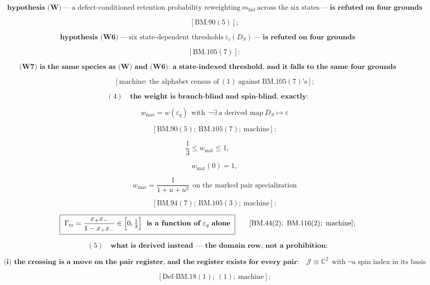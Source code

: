 \documentclass[11pt,openany]{report}
\theoremstyle{canonplain}
\theoremstyle{canondef}
\begin{document}
\[
\qquad \textbf{hypothesis (W)}\ —\ \text{a defect-conditioned retention probability reweighting}\ m_{\mathrm{hid}}\ \text{across the six states}\ —\ \textbf{is refuted on four grounds}
\]

\[
\qquad [\mathrm{BM.90}(5)];
\]

\[
\textbf{hypothesis (W6)}\ —\ \text{six state-dependent thresholds}\ \varepsilon_i(D_S)\ —\ \textbf{is refuted on four grounds}
\]

\[
\qquad [\mathrm{BM.105}(7)]:
\]

\[
\boxed{\ \textbf{(W7) is the same species as (W) and (W6): a state-indexed threshold, and it falls to the same four grounds}\ }
\]

\[
\qquad [\text{machine: the alphabet census of}\ (1)\ \text{against}\ \mathrm{BM.105}(7)\text{'s}];
\]

\[
(4)\quad\textbf{the weight is branch-blind and spin-blind, exactly:}
\]

\[
\qquad w_{\mathrm{mat}}=w(\varepsilon_q)\ \ \text{with}\ \ \neg\exists\ \text{a derived map}\ D_S\mapsto\varepsilon
\]

\[
\qquad [\mathrm{BM.90}(5);\ \mathrm{BM.105}(7);\ \text{machine}]:
\]

\[
\frac13\le w_{\mathrm{mat}}\le1,
\]

\[
\qquad w_{\mathrm{mat}}(0)=1,
\]

\[
\qquad w_{\mathrm{mat}}=\frac1{1+u+u^2}\ \ \text{on the marked pair specialization}
\]

\[
\qquad [\mathrm{BM.94}(7);\ \mathrm{BM.105}(3);\ \text{machine}];
\]

\[
\boxed{\ \Gamma_{\mathrm{tr}}=\frac{x_+x_-}{1-x_+x_-}\in\Bigl[0,\tfrac13\Bigr]\ \ \textbf{is a function of}\ \varepsilon_q\ \textbf{alone}\ }\qquad[\mathrm{BM.44}(2);\ \mathrm{BM.116}(2);\ \text{machine}];
\]

\[
(5)\quad\textbf{what is derived instead — the domain row, not a prohibition:}
\]

\[
\qquad \textbf{(i) the crossing is a move on the pair register, and the register exists for every pair:}\quad\mathcal J\cong\mathbb C^2\ \ \text{with}\ \neg\text{a spin index in its basis}
\]

\[
\qquad [\mathrm{Def\text{-}BM.18}(1);\ (1);\ \text{machine}];
\]
\end{document}
